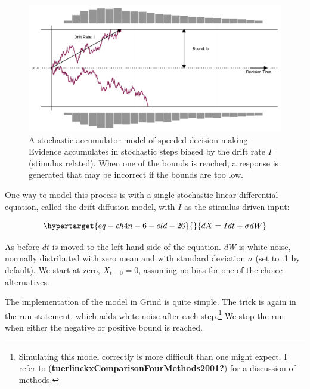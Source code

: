 \documentclass[
  a4paper,
  DIV=11,
  numbers=noendperiod,
  oneside]{scrreprt}
\begin{document}
\begin{figure}

{\centering \includegraphics{media/ch4n/fig-ch4n-img7-old-55.png}

}

\caption{\label{fig-ch4n-img7-old-55}A stochastic accumulator model of
speeded decision making. Evidence accumulates in stochastic steps biased
by the drift rate \(I\) (stimulus related). When one of the bounds is
reached, a response is generated that may be incorrect if the bounds are
too low.}

\end{figure}

One way to model this process is with a single stochastic linear
differential equation, called the drift-diffusion model, with \(I\) as
the stimulus-driven input:

\begin{equation}\protect\hypertarget{eq-ch4n-6-old-26}{}{
dX = Idt + \sigma dW
}\label{eq-ch4n-6-old-26}\end{equation}

As before \(dt\) is moved to the left-hand side of the equation. \(dW\)
is white noise, normally distributed with zero mean and with standard
deviation \(\sigma\) (set to .1 by default). We start at zero,
\(X_{t = 0} = 0\), assuming no bias for one of the choice alternatives.

The implementation of the model in Grind is quite simple. The trick is
again in the run statement, which adds white noise after each
step.\footnote{Simulating this model correctly is more difficult than
  one might expect. I refer to
  (\textbf{tuerlinckxComparisonFourMethods2001?}) for a discussion of
  methods.} We stop the run when either the negative or positive bound
is reached.
\end{document}
